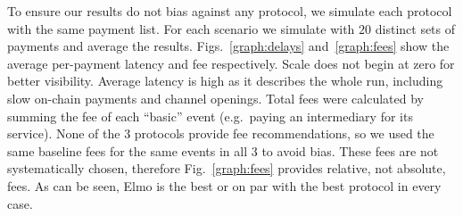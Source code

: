   To ensure our results do not bias against any protocol, we simulate each
  protocol with the same payment list. For each scenario we simulate with $20$
  distinct sets of payments and average the results. Figs.~\ref{graph:delays}
  and~\ref{graph:fees} show the average per-payment latency and fee
  respectively. Scale does not begin at zero for better visibility. Average
  latency is high as it describes the whole run, including slow on-chain
  payments and channel openings. Total fees were calculated by summing the fee
  of each ``basic'' event (e.g.\ paying an intermediary for its service). None
  of the $3$ protocols provide fee recommendations, so we used the same baseline
  fees for the same events in all $3$ to avoid bias. These
  fees are not systematically chosen, therefore Fig.~\ref{graph:fees} provides
  relative, not absolute, fees. As can be seen, Elmo is the best or on par with
  the best protocol in every case.

